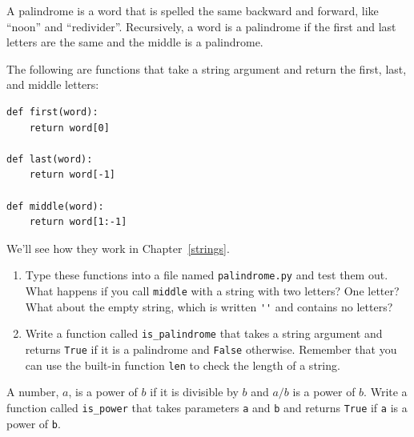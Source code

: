 \begin{ex}
\label{palindrome}


A palindrome is a word that is spelled the same backward and
forward, like ``noon'' and ``redivider''.  Recursively, a word
is a palindrome if the first and last letters are the same
and the middle is a palindrome.

The following are functions that take a string argument and
return the first, last, and middle letters:

\beforeverb
\begin{verbatim}
def first(word):
    return word[0]

def last(word):
    return word[-1]

def middle(word):
    return word[1:-1]
\end{verbatim}
\afterverb
%
We'll see how they work in Chapter~\ref{strings}.

\begin{enumerate}

\item Type these functions into a file named {\tt palindrome.py}
and test them out.  What happens if you call {\tt middle} with
a string with two letters?  One letter?  What about the empty
string, which is written \verb"''" and contains no letters?

\item Write a function called \verb"is_palindrome" that takes
a string argument and returns {\tt True} if it is a palindrome
and {\tt False} otherwise.  Remember that you can use the
built-in function {\tt len} to check the length of a string.

\end{enumerate}

\end{ex}

\begin{ex}
A number, $a$, is a power of $b$ if it is divisible by $b$
and $a/b$ is a power of $b$.  Write a function called
\verb"is_power" that takes parameters {\tt a} and {\tt b}
and returns {\tt True} if {\tt a} is a power of {\tt b}.
\end{ex}


